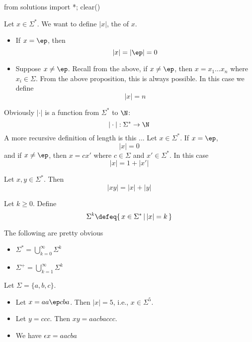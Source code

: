 \begin{python0}
from solutions import *; clear()
\end{python0}

\begin{defn} Let $x \in \Sigma^*$. We want to define $|x|$, the
 of $x$.
 \begin{itemize}
 \item If $x = \ep$, then
  \[
   |x| = |\ep| = 0
  \]
 \item Suppose $x \neq \ep$. Recall from the above, if $x \neq \ep$, then
  $x = x_1 \ldots x_n$ where $x_i \in \Sigma$. From the above
  proposition, this is always possible. In this case we define
  \[
   |x| = n
  \]
 \end{itemize}
 Obviously $|\cdot|$ is a function from $\Sigma^*$ to $\N$:
 \[
 |\cdot| : \Sigma^* \rightarrow \N
 \]
A more recursive definition of length is this ...
Let $x \in \Sigma^*$. If $x = \ep$,
\[
|x| = 0
\]
and if $x \neq \ep$, then $x = cx'$ where $c \in \Sigma$ and
$x' \in \Sigma^*$. In this case
\[
|x| = 1 + |x'|
\]
\end{defn}

\begin{prop}
Let $x,y \in \Sigma^*$. Then
\[ |xy| = |x| + |y| \]
\end{prop}

\begin{defn}
Let $k \geq 0$. Define
\[
 \Sigma^k \defeq \{\, x \in \Sigma^* \,|\, |x| = k \,\}
\]
\end{defn}

\begin{prop} The following are pretty obvious
 \begin{itemize}
  \item $\Sigma^* = \bigcup^\infty_{k=0} \Sigma^k$
  \item $\Sigma^+ = \bigcup^\infty_{k=1} \Sigma^k$
 \end{itemize}
\end{prop}

\newpage
\begin{eg}
 Let $\Sigma = \{a,b,c\}$.
 \begin{itemize}
  \item Let $x = aa\ep cba$. Then $|x| = 5$, i.e., $x \in \Sigma^5$.
  \item Let $y = ccc$. Then $xy = aacbaccc$.
  \item We have $\epsilon x = aacba$
 \end{itemize}
\end{eg}


